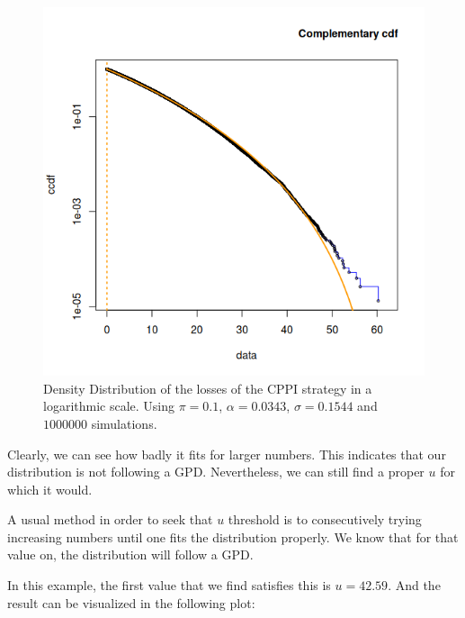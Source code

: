 \begin{figure}[h]
    \centering
    \includegraphics[scale=0.75]{images/cppi-ccdf-0.png}
    \caption{Density Distribution of the losses of the CPPI strategy in a logarithmic scale. Using $\pi = 0.1$, $\alpha = 0.0343$, $\sigma = 0.1544$ and $1000000$ simulations.}
    \label{fig:cppi-ccdf-0}
\end{figure}

Clearly, we can see how badly it fits for larger numbers. This indicates that our distribution is not following a GPD. Nevertheless, we can still find a proper $u$ for which it would.

A usual method in order to seek that $u$ threshold is to consecutively trying increasing numbers until one fits the distribution properly. We know that for that value on, the distribution will follow a GPD.

In this example, the first value that we find satisfies this is $u = 42.59$. And the result can be visualized in the following plot:

